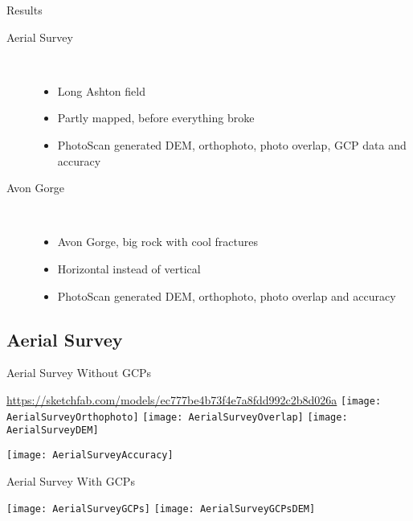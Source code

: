 \documentclass[table]{beamer}
\begin{document}
\begin{frame}{Results}
    \begin{description}
        \item[Aerial Survey] \hfill \\
            \begin{itemize}
                \item Long Ashton field
                \item Partly mapped, before everything broke
                \item PhotoScan generated DEM, orthophoto, photo overlap, GCP
                    data and accuracy
            \end{itemize}
        \item[Avon Gorge] \hfill \\
            \begin{itemize}
                \item Avon Gorge, big rock with cool fractures
                \item Horizontal instead of vertical
                \item PhotoScan generated DEM, orthophoto, photo overlap and accuracy
            \end{itemize}
    \end{description}
\end{frame}

\subsection{Aerial Survey}

\begin{frame}{Aerial Survey Without GCPs}
    \begin{center}
        \url{https://sketchfab.com/models/ec777be4b73f4e7a8fdd992c2b8d026a}
        \texttt{[image: AerialSurveyOrthophoto]}
        \texttt{[image: AerialSurveyOverlap]}
        \texttt{[image: AerialSurveyDEM]}
    \end{center}
    \begin{center}
        \texttt{[image: AerialSurveyAccuracy]}
    \end{center}
\end{frame}

\begin{frame}{Aerial Survey With GCPs}
    \begin{center}
        \texttt{[image: AerialSurveyGCPs]}
        \texttt{[image: AerialSurveyGCPsDEM]}
    \end{center}
\end{frame}
\end{document}
